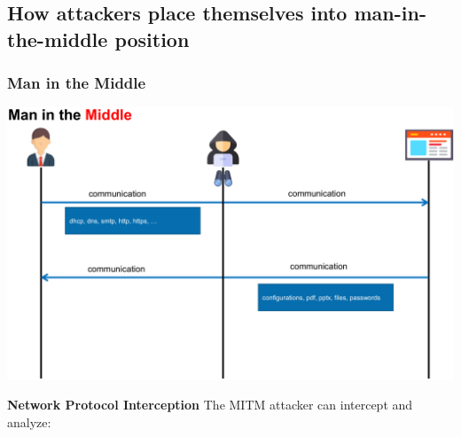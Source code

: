 \subsection{How attackers place themselves into man-in-the-middle position}
\subsubsection{Man in the Middle}

\begin{center}
\includegraphics[width=\textwidth]{resources/07-mitm.png}
\end{center}
\textbf{Network Protocol Interception}
The MITM attacker can intercept and analyze:

